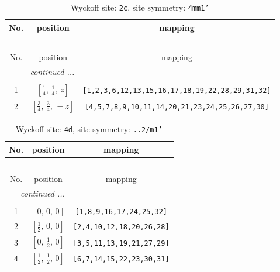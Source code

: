 \documentclass[fleqn,8pt]{jsarticle}
\begin{document}
\renewcommand{\arraystretch}{1.2}
\begin{longtable}{ccc}
\caption{Wyckoff site: {\tt 2c}, site symmetry: {\tt 4mm1'}}
 \\
 \hline \hline
No. & position & mapping \\ \hline \endfirsthead

\multicolumn{2}{l}{\tablename\ \thetable{}} \\
 \hline \hline
No. & position & mapping \\ \hline \endhead

 \hline \hline
\multicolumn{2}{r}{\footnotesize\it continued ...} \\ \endfoot

 \hline \hline
\multicolumn{2}{r}{} \\ \endlastfoot

1 & $\left[ \frac{1}{4},\, \frac{1}{4},\, z \right]$ & {\tt [1,2,3,6,12,13,15,16,17,18,19,22,28,29,31,32]} \\ \hline
2 & $\left[ \frac{3}{4},\, \frac{3}{4},\, - z \right]$ & {\tt [4,5,7,8,9,10,11,14,20,21,23,24,25,26,27,30]} \\
\end{longtable}
\renewcommand{\arraystretch}{1.2}
\begin{longtable}{ccc}
\caption{Wyckoff site: {\tt 4d}, site symmetry: {\tt ..2/m1'}}
 \\
 \hline \hline
No. & position & mapping \\ \hline \endfirsthead

\multicolumn{2}{l}{\tablename\ \thetable{}} \\
 \hline \hline
No. & position & mapping \\ \hline \endhead

 \hline \hline
\multicolumn{2}{r}{\footnotesize\it continued ...} \\ \endfoot

 \hline \hline
\multicolumn{2}{r}{} \\ \endlastfoot

1 & $\left[ 0,\, 0,\, 0 \right]$ & {\tt [1,8,9,16,17,24,25,32]} \\ \hline
2 & $\left[ \frac{1}{2},\, 0,\, 0 \right]$ & {\tt [2,4,10,12,18,20,26,28]} \\ \hline
3 & $\left[ 0,\, \frac{1}{2},\, 0 \right]$ & {\tt [3,5,11,13,19,21,27,29]} \\ \hline
4 & $\left[ \frac{1}{2},\, \frac{1}{2},\, 0 \right]$ & {\tt [6,7,14,15,22,23,30,31]} \\
\end{longtable}
\end{document}
